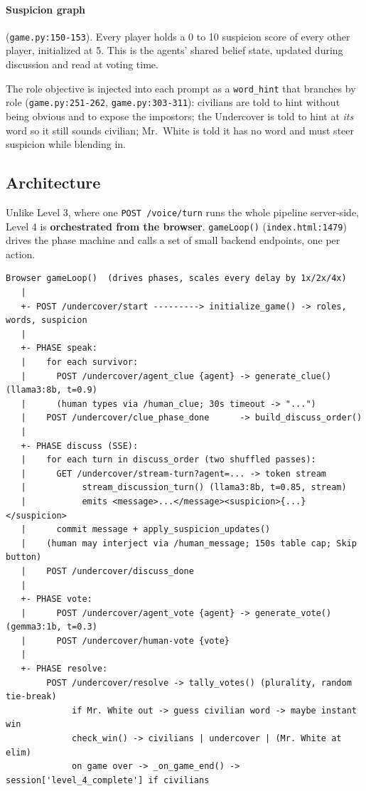 \documentclass[11pt,a4paper]{article}
\begin{document}
\paragraph{Suspicion graph} (\texttt{game.py:150-153}). Every player holds a 0 to
10 suspicion score of every other player, initialized at 5. This is the agents'
shared belief state, updated during discussion and read at voting time.

\noindent The role objective is injected into each prompt as a \texttt{word\_hint}
that branches by role (\texttt{game.py:251-262}, \texttt{game.py:303-311}):
civilians are told to hint without being obvious and to expose the impostors; the
Undercover is told to hint at \emph{its} word so it still sounds civilian; Mr.\
White is told it has no word and must steer suspicion while blending in.

\subsection{Architecture}
Unlike Level 3, where one \texttt{POST /voice/turn} runs the whole pipeline
server-side, Level 4 is \textbf{orchestrated from the browser}.
\texttt{gameLoop()} (\texttt{index.html:1479}) drives the phase machine and calls
a set of small backend endpoints, one per action.

\begin{lstlisting}
Browser gameLoop()  (drives phases, scales every delay by 1x/2x/4x)
   |
   +- POST /undercover/start ---------> initialize_game() -> roles, words, suspicion
   |
   +- PHASE speak:
   |    for each survivor:
   |      POST /undercover/agent_clue {agent} -> generate_clue() (llama3:8b, t=0.9)
   |      (human types via /human_clue; 30s timeout -> "...")
   |    POST /undercover/clue_phase_done      -> build_discuss_order()
   |
   +- PHASE discuss (SSE):
   |    for each turn in discuss_order (two shuffled passes):
   |      GET /undercover/stream-turn?agent=... -> token stream
   |           stream_discussion_turn() (llama3:8b, t=0.85, stream)
   |           emits <message>...</message><suspicion>{...}</suspicion>
   |      commit message + apply_suspicion_updates()
   |    (human may interject via /human_message; 150s table cap; Skip button)
   |    POST /undercover/discuss_done
   |
   +- PHASE vote:
   |      POST /undercover/agent_vote {agent} -> generate_vote() (gemma3:1b, t=0.3)
   |      POST /undercover/human-vote {vote}
   |
   +- PHASE resolve:
        POST /undercover/resolve -> tally_votes() (plurality, random tie-break)
             if Mr. White out -> guess civilian word -> maybe instant win
             check_win() -> civilians | undercover | (Mr. White at elim)
             on game over -> _on_game_end() -> session['level_4_complete'] if civilians
\end{lstlisting}
\end{document}
